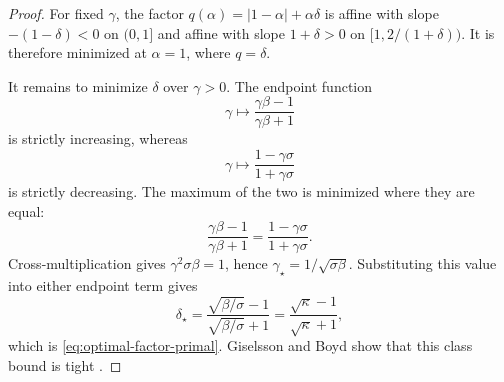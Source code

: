 \documentclass[10pt,leqno]{amsart}
\numberwithin{equation}{section}
\numberwithin{algorithm}{section}
\theoremstyle{remark}
\begin{document}
\begin{proof}
For fixed $\gamma$, the factor
$q(\alpha)=|1-\alpha|+\alpha\delta$ is affine with slope
$-(1-\delta)<0$ on $(0,1]$ and affine with slope
$1+\delta>0$ on $[1,2/(1+\delta))$.  It is therefore minimized at
$\alpha=1$, where $q=\delta$.

It remains to minimize $\delta$ over $\gamma>0$.  The endpoint function
\[
  \gamma\longmapsto\frac{\gamma\beta-1}{\gamma\beta+1}
\]
is strictly increasing, whereas
\[
  \gamma\longmapsto\frac{1-\gamma\sigma}{1+\gamma\sigma}
\]
is strictly decreasing.  The maximum of the two is minimized where they are equal:
\[
  \frac{\gamma\beta-1}{\gamma\beta+1}
  =\frac{1-\gamma\sigma}{1+\gamma\sigma}.
\]
Cross-multiplication gives $\gamma^2\sigma\beta=1$, hence
$\gamma_\star=1/\sqrt{\sigma\beta}$.  Substituting this value into either endpoint term gives
\[
  \delta_\star
  =\frac{\sqrt{\beta/\sigma}-1}
         {\sqrt{\beta/\sigma}+1}
  =\frac{\sqrt\kappa-1}{\sqrt\kappa+1},
\]
which is \eqref{eq:optimal-factor-primal}.  Giselsson and Boyd show that this class bound is tight \cite{GiselssonBoyd2017}.
\end{proof}



\end{document}
